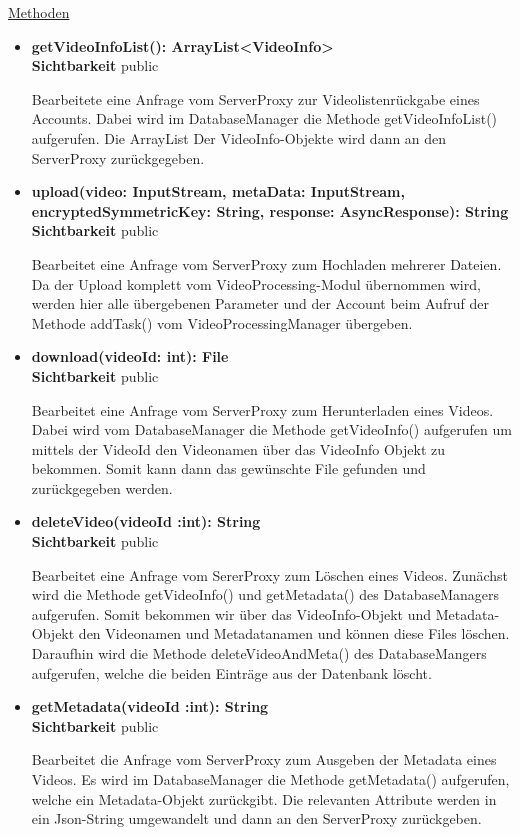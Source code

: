 \underline{Methoden}
\begin{itemize}
\itemsep0pt
\item \textbf{getVideoInfoList(): ArrayList<VideoInfo>}\hfill\\
\textbf{Sichtbarkeit} public

Bearbeitete eine Anfrage vom ServerProxy zur Videolistenrückgabe eines Accounts. Dabei wird im DatabaseManager die Methode getVideoInfoList() aufgerufen. Die ArrayList Der VideoInfo-Objekte wird dann an den ServerProxy zurückgegeben.    

\item \textbf{upload(video: InputStream, metaData: InputStream,
encryptedSymmetricKey: String, response: AsyncResponse): String}\hfill\\
\textbf{Sichtbarkeit} public

Bearbeitet eine Anfrage vom ServerProxy zum Hochladen mehrerer Dateien. Da der Upload komplett vom VideoProcessing-Modul übernommen wird, werden hier alle übergebenen Parameter und der Account beim Aufruf der Methode addTask() vom VideoProcessingManager übergeben.

\item \textbf{download(videoId: int): File}\hfill\\
\textbf{Sichtbarkeit} public

Bearbeitet eine Anfrage vom ServerProxy zum Herunterladen eines Videos. Dabei wird vom DatabaseManager die Methode getVideoInfo() aufgerufen um mittels der VideoId den Videonamen über das VideoInfo Objekt zu bekommen. Somit kann dann das gewünschte File gefunden und zurückgegeben werden.

\item \textbf{deleteVideo(videoId :int): String}\hfill\\
\textbf{Sichtbarkeit} public

Bearbeitet eine Anfrage vom SererProxy zum Löschen eines Videos. Zunächst wird die Methode getVideoInfo() und getMetadata() des DatabaseManagers aufgerufen. Somit bekommen wir über das VideoInfo-Objekt und Metadata-Objekt den Videonamen und Metadatanamen und können diese Files löschen. Daraufhin wird die Methode deleteVideoAndMeta() des DatabaseMangers aufgerufen, welche die beiden Einträge aus der Datenbank löscht.

\item \textbf{getMetadata(videoId :int): String}\hfill\\
\textbf{Sichtbarkeit} public

Bearbeitet die Anfrage vom ServerProxy zum Ausgeben der Metadata eines Videos. Es wird im DatabaseManager die Methode getMetadata() aufgerufen, welche ein Metadata-Objekt zurückgibt. Die relevanten Attribute werden in ein Json-String umgewandelt und dann an den ServerProxy zurückgeben.

\end{itemize}